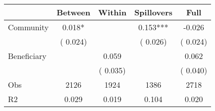 
\begin{tabular}{l*{4}{c}}\hline&\multicolumn{1}{c}{Between}&\multicolumn{1}{c}{Within}&\multicolumn{1}{c}{Spillovers}&\multicolumn{1}{c}{Full}\\ \hline
 Community             &              0.018*      &                                               &        0.153*** &        -0.026                            \\ 
                               &        (       0.024)           &                                       &       (       0.026)     &      (       0.024)                                           \\ 
 Beneficiary   &                                               &        0.059    &                                &             0.062                            \\ 
                               &                                               & (       0.035)                  &                                        &      (       0.040)                                           \\ 
\hline                                                                                                                                                                                                                                            
 Obs                   &               2126               &       1924                       &       1386                &              2718                                               \\ 
 R2                    &                      0.029              &              0.019                      &              0.104               &                     0.020                                              \\ 
\hline \end{tabular}                                                                                                                                                                                                              